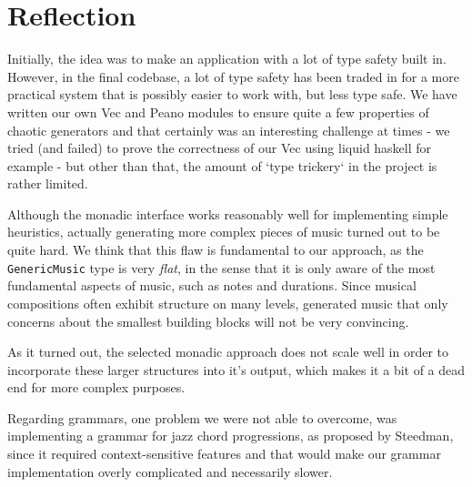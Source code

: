 \documentclass[11pt,a4paper]{article}
\newcommand{\icode}[1]{\texttt{#1}}
\begin{document}
\section{Reflection}
Initially, the idea was to make an application with a lot of type safety built in. However, in the final codebase, a lot of type safety has been traded in for a more practical system that is possibly easier to work with, but less type safe. We have written our own Vec and Peano modules to ensure quite a few properties of chaotic generators and that certainly was an interesting challenge at times - we tried (and failed) to prove the correctness of our Vec using liquid haskell for example - but other than that, the amount of `type trickery` in the project is rather limited.

Although the monadic interface works reasonably well for implementing simple heuristics, actually generating more complex pieces of music turned out to be quite hard. We think that this flaw is fundamental to our approach, as the \icode{GenericMusic} type is very \emph{flat}, in the sense that it is only aware of the most fundamental aspects of music, such as notes and durations. Since musical compositions often exhibit structure on many levels, generated music that only concerns about the smallest building blocks will not be very convincing.

As it turned out, the selected monadic approach does not scale well in order to incorporate these larger structures into it's output, which makes it a bit of a dead end for more complex purposes.

Regarding grammars, one problem we were not able to overcome, was implementing a grammar for jazz chord progressions, as proposed by Steedman\cite{jazzchords}, since it required context-sensitive features and that would make our grammar implementation overly complicated and necessarily slower.\\

\newpage


\end{document}
